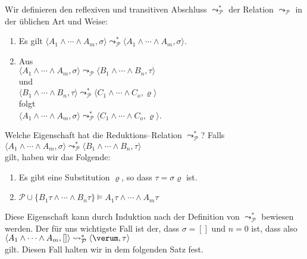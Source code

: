 Wir definieren den reflexiven und transitiven Abschluss $\leadsto_\mathcal{P}^*$ der Relation $\leadsto_\mathcal{P}$ in der \"{u}blichen Art und Weise:
\begin{enumerate}
\item Es gilt $\langle A_1 \wedge \cdots \wedge A_m, \sigma \rangle \leadsto_\mathcal{P}^* \langle A_1 \wedge \cdots \wedge A_m, \sigma \rangle$.
\item Aus \\[0.1cm]
     \hspace*{1.3cm}  $\langle A_1 \wedge \cdots \wedge A_m, \sigma \rangle \leadsto_\mathcal{P} \langle B_1 \wedge \cdots \wedge B_n, \tau \rangle$ \\[0.1cm]
     und \\[0.1cm]
     \hspace*{1.3cm}  $\langle B_1 \wedge \cdots \wedge B_n, \tau \rangle \leadsto_\mathcal{P}^* \langle C_1 \wedge \cdots \wedge C_o, \varrho \rangle$ \\[0.1cm]
     folgt \\[0.1cm]
     \hspace*{1.3cm}  $\langle A_1 \wedge \cdots \wedge A_m, \sigma \rangle \leadsto_\mathcal{P}^* \langle C_1 \wedge \cdots \wedge C_o, \varrho \rangle$.
\end{enumerate}


Welche Eigenschaft hat die Reduktions--Relation $\leadsto_\mathcal{P}^*$? Falls \\[0.1cm]
\hspace*{1.3cm} $\langle A_1 \wedge \cdots \wedge A_m, \sigma \rangle \leadsto_\mathcal{P}^* \langle B_1 \wedge \cdots \wedge B_n, \tau \rangle$ \\[0.1cm]
gilt, haben wir das Folgende:
\begin{enumerate}
\item Es gibt eine Substitution $\varrho$, so dass $\tau = \sigma\varrho$ ist.
\item $\mathcal{P} \cup \big\{ B_1\tau \wedge \cdots \wedge B_n\tau \big\} \models A_1\tau \wedge \cdots \wedge A_m\tau$
\end{enumerate}
Diese Eigenschaft kann durch Induktion nach der Definition von $\leadsto_\mathcal{P}^*$ bewiesen werden.  Der f\"{u}r uns wichtigste Fall ist der, dass
$\sigma = []$ und $n = 0$ ist, dass also
\hspace*{1.3cm} $\langle A_1 \wedge \cdots \wedge A_m, [] \rangle \leadsto_\mathcal{P}^* \langle \verum, \tau \rangle$ \\[0.1cm]
gilt.  Diesen Fall halten wir in dem folgenden Satz fest.


